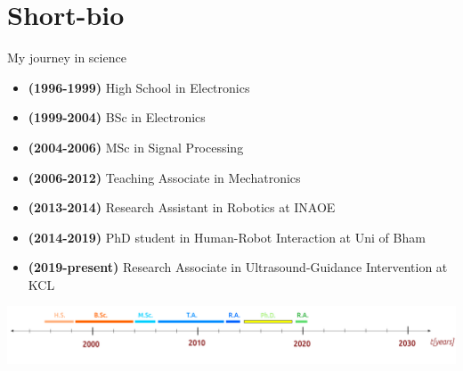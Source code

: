 \section{Short-bio}

\begin{frame}{My journey in science}

\begin{itemize}	
	\item \textbf{(1996-1999)} High School in Electronics
	\item \textbf{(1999-2004)} BSc in Electronics  
	\item \textbf{(2004-2006)} MSc in Signal Processing 
	\item \textbf{(2006-2012)} Teaching Associate in Mechatronics 
	\item \textbf{(2013-2014)} Research Assistant in Robotics at INAOE  
	\item \textbf{(2014-2019)} PhD student in Human-Robot Interaction at Uni of Bham \\
	\item \textbf{(2019-present)} Research Associate in Ultrasound-Guidance 
	Intervention at KCL 
\end{itemize}

	\vspace{4mm}
        \includegraphics[width=\linewidth]{./figs/myjourney/versions/drawing.png}

\end{frame}





